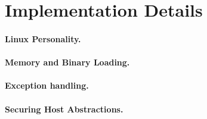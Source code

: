 \section{Implementation Details}

\paragraph{Linux Personality.}

\paragraph{Memory and Binary Loading.}

\paragraph{Exception handling.}

\paragraph{Securing Host Abstractions.}

